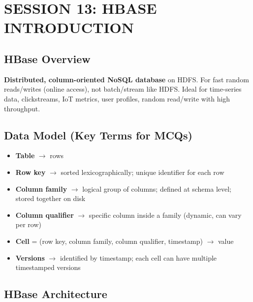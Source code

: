 \documentclass[11pt, onecolumn, a4paper]{article}
\begin{document}
\newpage
\section{SESSION 13: HBASE INTRODUCTION}

\subsection{HBase Overview}

\textbf{Distributed, column-oriented NoSQL database} on HDFS. For fast random reads/writes (online access), not batch/stream like HDFS. Ideal for time-series data, clickstreams, IoT metrics, user profiles, random read/write with high throughput.

\subsection{Data Model (Key Terms for MCQs)}

\begin{itemize}
  \item \textbf{Table} $\rightarrow$ rows
  \item \textbf{Row key} $\rightarrow$ sorted lexicographically; unique identifier for each row
  \item \textbf{Column family} $\rightarrow$ logical group of columns; defined at schema level; stored together on disk
  \item \textbf{Column qualifier} $\rightarrow$ specific column inside a family (dynamic, can vary per row)
  \item \textbf{Cell} = (row key, column family, column qualifier, timestamp) $\rightarrow$ value
  \item \textbf{Versions} $\rightarrow$ identified by timestamp; each cell can have multiple timestamped versions
\end{itemize}

\subsection{HBase Architecture}
\end{document}
